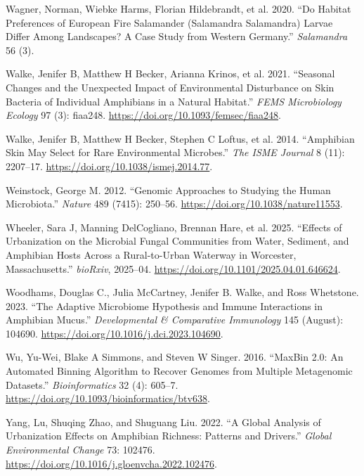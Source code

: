 \documentclass[
  12pt,
]{article}
\newlength{\cslhangindent}
\newenvironment{CSLReferences}[2] %
 {\begin{list}{}{%
  \setlength{\itemindent}{0pt}
  \setlength{\leftmargin}{0pt}
  \setlength{\parsep}{0pt}
  \ifodd #1
   \setlength{\leftmargin}{\cslhangindent}
   \setlength{\itemindent}{-1\cslhangindent}
  \fi
  \setlength{\itemsep}{#2\baselineskip}}}
 {\end{list}}
\begin{document}
\begin{CSLReferences}{1}{1}
Wagner, Norman, Wiebke Harms, Florian Hildebrandt, et al. 2020. {``Do
Habitat Preferences of {European} Fire Salamander ({Salamandra}
Salamandra) Larvae Differ Among Landscapes? {A} Case Study from
{Western} {Germany}.''} \emph{Salamandra} 56 (3).

Walke, Jenifer B, Matthew H Becker, Arianna Krinos, et al. 2021.
{``Seasonal Changes and the Unexpected Impact of Environmental
Disturbance on Skin Bacteria of Individual Amphibians in a Natural
Habitat.''} \emph{FEMS Microbiology Ecology} 97 (3): fiaa248.
\url{https://doi.org/10.1093/femsec/fiaa248}.

Walke, Jenifer B, Matthew H Becker, Stephen C Loftus, et al. 2014.
{``Amphibian Skin May Select for Rare Environmental Microbes.''}
\emph{The ISME Journal} 8 (11): 2207--17.
\url{https://doi.org/10.1038/ismej.2014.77}.

Weinstock, George M. 2012. {``Genomic Approaches to Studying the Human
Microbiota.''} \emph{Nature} 489 (7415): 250--56.
\url{https://doi.org/10.1038/nature11553}.

Wheeler, Sara J, Manning DelCogliano, Brennan Hare, et al. 2025.
{``Effects of Urbanization on the Microbial Fungal Communities from
Water, Sediment, and Amphibian Hosts Across a Rural-to-Urban Waterway in
{Worcester}, {Massachusetts}.''} \emph{bioRxiv}, 2025--04.
\url{https://doi.org/10.1101/2025.04.01.646624}.

Woodhams, Douglas C., Julia McCartney, Jenifer B. Walke, and Ross
Whetstone. 2023. {``The Adaptive Microbiome Hypothesis and Immune
Interactions in Amphibian Mucus.''} \emph{Developmental \& Comparative
Immunology} 145 (August): 104690.
\url{https://doi.org/10.1016/j.dci.2023.104690}.

Wu, Yu-Wei, Blake A Simmons, and Steven W Singer. 2016. {``{MaxBin} 2.0:
An Automated Binning Algorithm to Recover Genomes from Multiple
Metagenomic Datasets.''} \emph{Bioinformatics} 32 (4): 605--7.
\url{https://doi.org/10.1093/bioinformatics/btv638}.

Yang, Lu, Shuqing Zhao, and Shuguang Liu. 2022. {``A Global Analysis of
Urbanization Effects on Amphibian Richness: {Patterns} and Drivers.''}
\emph{Global Environmental Change} 73: 102476.
\url{https://doi.org/10.1016/j.gloenvcha.2022.102476}.


\end{CSLReferences}
\end{document}
